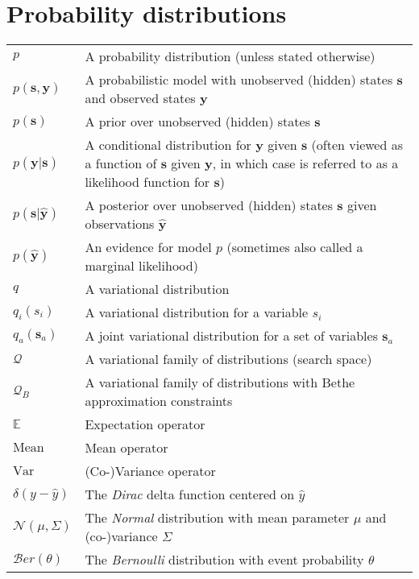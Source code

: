 \section*{Probability distributions}
\begin{table}[H]
    \raggedright
    \begin{tabularx}{\textwidth}{l X}
        $p$                        & A probability distribution (unless stated otherwise)                                                  \\
        $p(\bm{s}, \bm{y})$        & A probabilistic model with unobserved (hidden) states $\bm{s}$ and observed states $\bm{y}$  \\
        $p(\bm{s})$                & A prior over unobserved (hidden) states $\bm{s}$ \\
        $p(\bm{y}\vert\bm{s})$     & A conditional distribution for $\bm{y}$ given $\bm{s}$ (often viewed as a function of $\bm{s}$ given $\bm{y}$, in which case is referred to as a likelihood function for $\bm{s}$) \\
        $p(\bm{s}\vert\hat{\bm{y}})$ & A posterior over unobserved (hidden) states $\bm{s}$ given observations $\hat{\bm{y}}$ \\
        $p(\hat{\bm{y}})$          & An evidence for model $p$ (sometimes also called a marginal likelihood)  \\
        $q$                        & A variational distribution \\
        $q_i(s_i)$                 & A variational distribution for a variable $s_i$                                                       \\
        $q_a(\bm{s}_a)$            & A joint variational distribution for a set of variables $\bm{s}_a$                                    \\
        $\mathcal{Q}$              & A variational family of distributions (search space)                                                  \\
        $\mathcal{Q}_{B}$          & A variational family of distributions with Bethe approximation constraints                            \\
        $\mathbb{E}$ & Expectation operator\\
        $\mathrm{Mean}$ & Mean operator \\ 
        $\mathrm{Var}$ & (Co-)Variance operator \\ 
        $\delta(y - \hat{y})$      & The \textit{Dirac} delta function centered on $\hat{y}$                                       \\
        $\mathcal{N}(\mu, \Sigma)$ & The \textit{Normal} distribution with mean parameter $\mu$ and (co-)variance $\Sigma$ \\
        $\mathcal{B}er(\theta)$    & The \textit{Bernoulli} distribution with event probability $\theta$           \\
    \end{tabularx}
    \label{tab:notation_probability}
\end{table}

